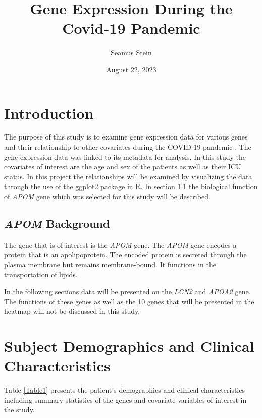 \documentclass{article}
\title{Gene Expression During the Covid-19 Pandemic}
\author{Seamus Stein}
\date{August 22, 2023}
\begin{document}
\maketitle
\tableofcontents
\newpage
\section{Introduction}
The purpose of this study is to examine gene expression data for various genes and their relationship to other covariates during the COVID-19 pandemic \cite{Overmyer2021}. The gene expression data was linked to its metadata for analysis. In this study the covariates of interest are the age and sex of the patients as well as their ICU status. In this project the relationships will be examined by visualizing the data through the use of the ggplot2 package in R. In section 1.1 the biological function of \emph{APOM} gene which was selected for this study will be described. 

\subsection{\emph{APOM} Background}
The  gene that is of interest is the \emph{APOM} gene. The \emph{APOM} gene encodes a protein that is an apolipoprotein. The encoded protein is secreted through the plasma membrane but remains membrane-bound. It functions in the transportation of lipids. \cite{pubchem_apom_2023} 


In the following sections data will be presented on the \emph{LCN2} and \emph{APOA2} gene. The functions of these genes as well as the 10 genes that will be presented in the heatmap will not be discussed in this study.

\section{Subject Demographics and Clinical Characteristics}
Table \ref{Table1} presents the patient's demographics and clinical characteristics including summary statistics of the genes and covariate variables of interest in the study.
\end{document}

